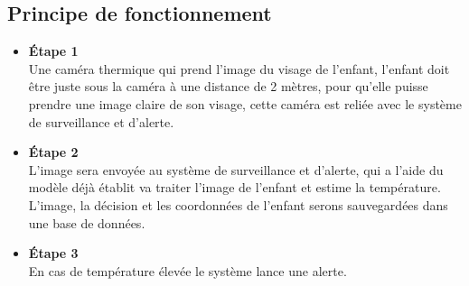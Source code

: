 \documentclass[12pt]{article}
\begin{document}
\subsection{Principe de fonctionnement}
\begin{itemize}
	\item \textbf{Étape 1}\\
	Une caméra thermique qui prend l'image du visage de l'enfant, l'enfant doit être juste sous la caméra à une distance de 2 mètres, pour qu’elle puisse prendre une image claire de son visage, cette caméra est reliée avec le système de surveillance et d'alerte.
	\item \textbf{Étape 2}\\
	L'image sera envoyée  au système de surveillance et d'alerte, qui a l'aide du modèle déjà établit va traiter l'image de l’enfant et estime la température.\\
	L'image, la décision et les coordonnées de l'enfant serons sauvegardées dans une base de données.
	\item \textbf{Étape 3}\\
	En cas de température élevée le système lance une alerte.
\end{itemize}
\end{document}
